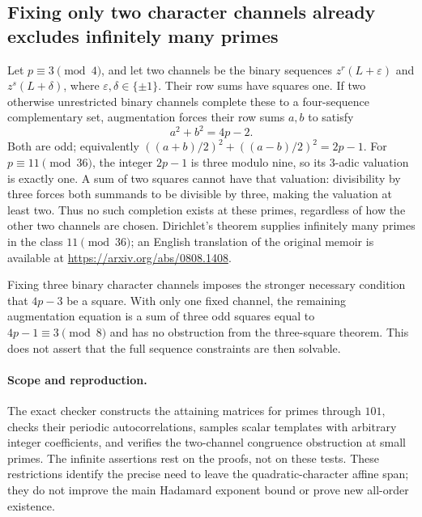 \subsection{Fixing only two character channels already excludes infinitely many primes}
Let $p\equiv3\pmod4$, and let two channels be the binary sequences
$z^r(L+\varepsilon)$ and $z^s(L+\delta)$, where
$\varepsilon,\delta\in\{\pm1\}$. Their row sums have squares one.
If two otherwise unrestricted binary channels complete these to a
four-sequence complementary set, augmentation forces their row sums
$a,b$ to satisfy
\[
 a^2+b^2=4p-2.
\]
Both are odd; equivalently
$((a+b)/2)^2+((a-b)/2)^2=2p-1$.
For $p\equiv11\pmod{36}$, the integer $2p-1$ is three modulo nine,
so its $3$-adic valuation is exactly one. A sum of two squares cannot
have that valuation: divisibility by three forces both summands to
be divisible by three, making the valuation at least two. Thus no
such completion exists at these primes, regardless of how the other
two channels are chosen. Dirichlet's theorem supplies infinitely many
primes in the class $11\pmod{36}$; an English translation of the
original memoir is available at \url{https://arxiv.org/abs/0808.1408}.

Fixing three binary character channels imposes the stronger necessary
condition that $4p-3$ be a square. With only one fixed channel, the
remaining augmentation equation is a sum of three odd squares equal
to $4p-1\equiv3\pmod8$ and has no obstruction from the three-square
theorem. This does not assert that the full sequence constraints are
then solvable.

\paragraph{Scope and reproduction.}
The exact checker constructs the attaining matrices for primes through
$101$, checks their periodic autocorrelations, samples scalar templates
with arbitrary integer coefficients, and verifies the two-channel
congruence obstruction at small primes. The infinite assertions rest
on the proofs, not on these tests. These restrictions identify the
precise need to leave the quadratic-character affine span; they do not
improve the main Hadamard exponent bound or prove new all-order existence.

